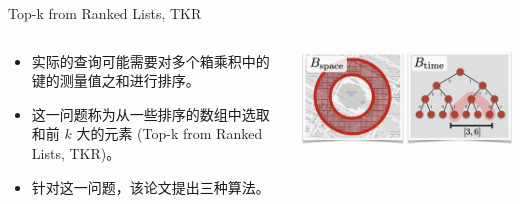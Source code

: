 \documentclass[10pt,aspectratio=169]{ctexbeamer}
\begin{document}
\begin{frame}{Top-k from Ranked Lists, TKR}
    \begin{columns}
        \begin{column}{.6\textwidth}
            \begin{itemize}[<+->]
                \item 实际的查询可能需要对多个箱乘积中的键的测量值之和进行排序。
                \item 这一问题称为从一些排序的数组中选取和前 $k$ 大的元素 (Top-k from Ranked Lists, TKR)。
                \item 针对这一问题，该论文提出三种算法。
            \end{itemize}
        \end{column}
        \begin{column}{.4\textwidth}
            \includegraphics[width=\textwidth]{pic/query.jpg}
        \end{column}
    \end{columns}
\end{frame}
\end{document}
